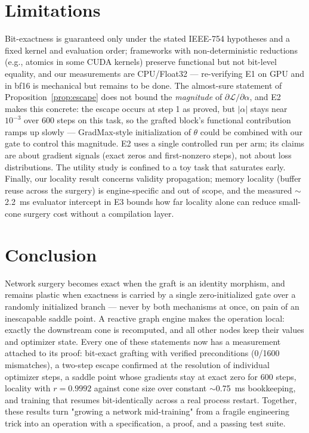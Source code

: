 \documentclass[11pt,a4paper]{article}
\newcommand{\Loss}{\mathcal{L}}
\begin{document}
\section{Limitations}
\label{sec:limitations}
Bit-exactness is guaranteed only under the stated IEEE-754 hypotheses and a fixed kernel and evaluation order; frameworks with non-deterministic reductions (e.g., atomics in some CUDA kernels) preserve functional but not bit-level equality, and our measurements are CPU\slash Float32 --- re-verifying E1 on GPU and in bf16 is mechanical but remains to be done. The almost-sure statement of Proposition~\ref{prop:escape} does not bound the \emph{magnitude} of $\partial\Loss/\partial\alpha$, and E2 makes this concrete: the escape occurs at step 1 as proved, but $|\alpha|$ stays near $10^{-3}$ over 600 steps on this task, so the grafted block's functional contribution ramps up slowly --- GradMax-style \cite{gradmax} initialization of $\theta$ could be combined with our gate to control this magnitude. E2 uses a single controlled run per arm; its claims are about gradient signals (exact zeros and first-nonzero steps), not about loss distributions. The utility study is confined to a toy task that saturates early. Finally, our locality result concerns validity propagation; memory locality (buffer reuse across the surgery) is engine-specific and out of scope, and the measured $\sim$2.2~ms evaluator intercept in E3 bounds how far locality alone can reduce small-cone surgery cost without a compilation layer.

\section{Conclusion}
Network surgery becomes exact when the graft is an identity morphism, and remains plastic when exactness is carried by a single zero-initialized gate over a randomly initialized branch --- never by both mechanisms at once, on pain of an inescapable saddle point. A reactive graph engine makes the operation local: exactly the downstream cone is recomputed, and all other nodes keep their values and optimizer state. Every one of these statements now has a measurement attached to its proof: bit-exact grafting with verified preconditions (0/1600 mismatches), a two-step escape confirmed at the resolution of individual optimizer steps, a saddle point whose gradients stay at exact zero for 600 steps, locality with $r = 0.9992$ against cone size over constant $\sim$0.75~ms bookkeeping, and training that resumes bit-identically across a real process restart. Together, these results turn "growing a network mid-training" from a fragile engineering trick into an operation with a specification, a proof, and a passing test suite.
\end{document}

